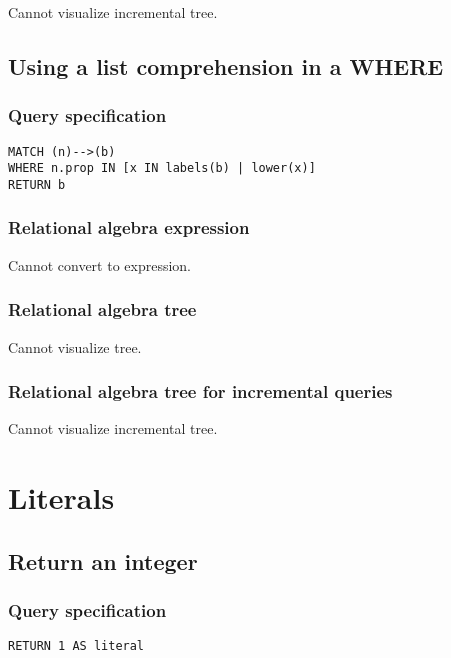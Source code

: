 Cannot visualize incremental tree.

\subsection{Using a list comprehension in a WHERE}

\subsubsection*{Query specification}

\begin{lstlisting}
MATCH (n)-->(b)
WHERE n.prop IN [x IN labels(b) | lower(x)]
RETURN b
\end{lstlisting}

\subsubsection*{Relational algebra expression}

Cannot convert to expression.

\subsubsection*{Relational algebra tree}

Cannot visualize tree.

\subsubsection*{Relational algebra tree for incremental queries}

Cannot visualize incremental tree.

\section{Literals}

\subsection{Return an integer}

\subsubsection*{Query specification}

\begin{lstlisting}
RETURN 1 AS literal
\end{lstlisting}

